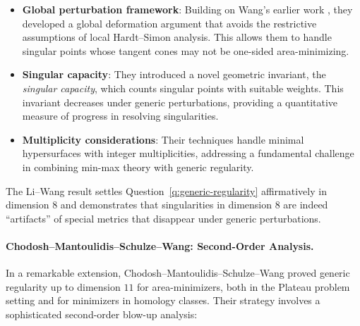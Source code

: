 \begin{itemize}
    \item \textbf{Global perturbation framework}: Building on Wang's earlier work \cite{Wang20},
    they developed a global deformation argument that avoids the restrictive assumptions of local
    Hardt--Simon analysis. This allows them to handle singular points whose tangent cones may not be
    one-sided area-minimizing.

    \item \textbf{Singular capacity}: They introduced a novel geometric invariant, the
    \emph{singular capacity}, which counts singular points with suitable weights. This invariant
    decreases under generic perturbations, providing a quantitative measure of progress in resolving
    singularities.

    \item \textbf{Multiplicity considerations}: Their techniques handle minimal hypersurfaces with
    integer multiplicities, addressing a fundamental challenge in combining min-max theory with
    generic regularity.
\end{itemize}

The Li--Wang result settles Question~\ref{q:generic-regularity} affirmatively in dimension $8$ and
demonstrates that singularities in dimension $8$ are indeed ``artifacts'' of special metrics that
disappear under generic perturbations.

\paragraph{Chodosh--Mantoulidis--Schulze--Wang: Second-Order Analysis.}
In a remarkable extension, Chodosh--Mantoulidis--Schulze--Wang \cite{CMSW-dim11} proved generic
regularity up to dimension $11$ for area-minimizers, both in the Plateau problem setting and for
minimizers in homology classes. Their strategy involves a sophisticated second-order blow-up
analysis:

